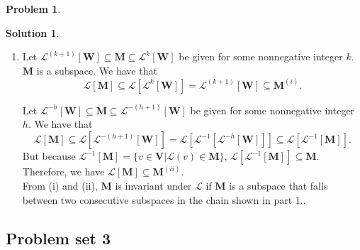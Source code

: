 \documentclass{article}
\theoremstyle{definition}
\newtheorem*{prob*}{Problem}
\newtheorem*{sln*}{Solution}
\newcommand{\V}{\mathbf{V}}
\newcommand{\W}{\mathbf{W}}
\newcommand{\lag}{\mathcal{L}}
\begin{document}
\begin{prob*}
\begin{sln*}
\begin{enumerate}
				
				
				
				
			\item	
			Let $\lag^{(k+1)}[\W] \subseteq \mathbf{M} \subseteq \lag^{k}[\W]$ be given for some nonnegative integer $k$. $\mathbf{M}$ is a subspace. We have that
			$$\lag[\mathbf{M}] \subseteq \lag[\lag^{k}[\W]] = \lag^{(k+1)}[\W] \subseteq \mathbf{M}^{(i)}. $$
			
			Let $\lag^{-h}[\mathbf{W}] \subseteq \mathbf{M} \subseteq \lag^{-(h+1)}[\W]$ be given for some nonnegative integer $h$. We have that
			$$ \lag[\mathbf{M}] \subseteq \lag[\lag^{-(h+1)}[\W]] = \lag[\lag^{-1}[\lag^{-h}[\W]]] \subseteq \lag[\lag^{-1}[\mathbf{M}]].  $$
			But because $\lag^{-1}[\mathbf{M}] = \{ v\in \V \vert \lag(v)\in \mathbf{M} \}$, $\lag[\lag^{-1}[\mathbf{M}]] \subseteq \mathbf{M}$. Therefore, we have $\lag[\mathbf{M}] \subseteq \mathbf{M}^{(ii)}$.\\ 
			
			From (i) and (ii), $\mathbf{M}$ is invariant under $\lag$ if $\mathbf{M}$ is a subspace that falls between two consecutive subspaces in the chain shown in part 1.. 
			
		\end{enumerate}
	\end{sln*}
\end{prob*}






































\newpage
\subsection{Problem set 3}
\end{document}
